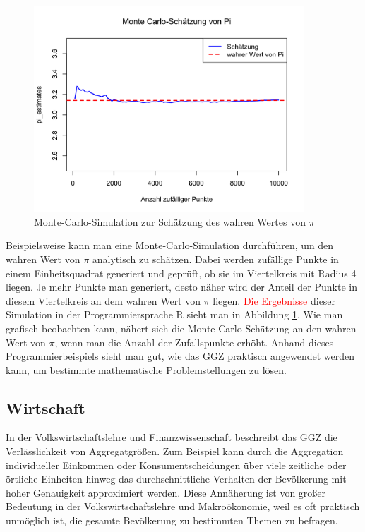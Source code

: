\documentclass[aodsor,preprint]{imsart}
\numberwithin{equation}{section}
\theoremstyle{plain}
\begin{document}
\begin{figure}[h!]
  \centering
  \includegraphics[width=0.9\textwidth]{Monte_carlo.png}
  \caption{Monte-Carlo-Simulation zur Schätzung des wahren Wertes von \texorpdfstring{$\pi$}{π}}
  \label{fig:monte_carlo}
\end{figure}


Beispielsweise kann man eine Monte-Carlo-Simulation durchführen, um den wahren Wert von \texorpdfstring{$\pi$}{π} analytisch zu schätzen.
Dabei werden zufällige Punkte in einem Einheitsquadrat generiert und geprüft, ob sie im Viertelkreis mit Radius 4 liegen.
Je mehr Punkte man generiert, desto näher wird der Anteil der Punkte in diesem Viertelkreis an dem wahren Wert von \texorpdfstring{$\pi$}{π} liegen.
\textcolor{red}{Die Ergebnisse} dieser Simulation in der Programmiersprache R sieht man in Abbildung \ref{fig:monte_carlo}.
Wie man grafisch beobachten kann, nähert sich die Monte-Carlo-Schätzung an den wahren Wert von \texorpdfstring{$\pi$}{π}, wenn man die Anzahl der Zufallspunkte erhöht.
Anhand dieses Programmierbeispiels sieht man gut, wie das GGZ praktisch angewendet werden kann, um bestimmte mathematische Problemstellungen zu lösen.


\subsection{Wirtschaft}


In der Volkswirtschaftslehre und Finanzwissenschaft beschreibt das GGZ die Verlässlichkeit von Aggregatgrößen.
Zum Beispiel kann durch die Aggregation individueller Einkommen oder Konsumentscheidungen über viele zeitliche oder örtliche Einheiten hinweg das durchschnittliche Verhalten der Bevölkerung mit hoher Genauigkeit approximiert werden.
Diese Annäherung ist von großer Bedeutung in der Volkswirtschaftslehre und Makroökonomie, weil es oft praktisch unmöglich ist, die gesamte Bevölkerung zu bestimmten Themen zu befragen.
\end{document}
